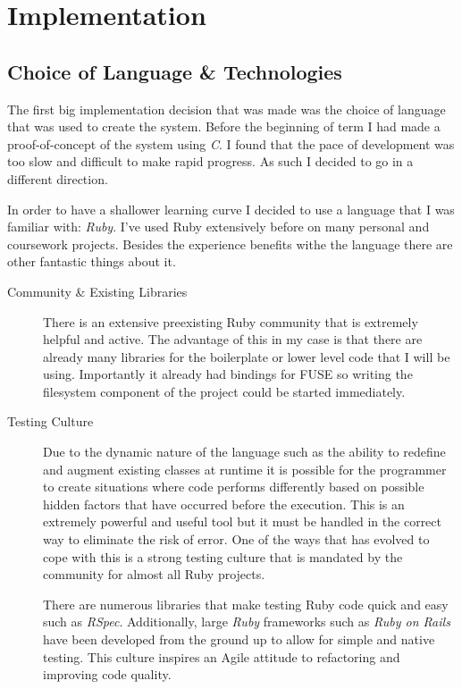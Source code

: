 \chapter{Implementation}

\section{Choice of Language \& Technologies}

The first big implementation decision that was made was the choice of language that was used to create the system. Before the beginning of term I had made a proof-of-concept of the system using \emph{C}. I found that the pace of development was too slow and difficult to make rapid progress. As such I decided to go in a different direction.

In order to have a shallower learning curve I decided to use a language that I was familiar with: \emph{Ruby}. I've used Ruby extensively before on many personal and coursework projects. Besides the experience benefits withe the language there are other fantastic things about it.

\begin{description}

\item[Community \& Existing Libraries] \hfill

There is an extensive preexisting Ruby community that is extremely helpful and active. The advantage of this in my case is that there are already many libraries for the boilerplate or lower level code that I will be using. Importantly it already had bindings for \ac{FUSE} so writing the filesystem component of the project could be started immediately.

\item[Testing Culture] \hfill

Due to the dynamic nature of the language such as the ability to redefine and augment existing classes at runtime it is possible for the programmer to create situations where code performs differently based on possible hidden factors that have occurred before the execution. This is an extremely powerful and useful tool but it must be handled in the correct way to eliminate the risk of error. One of the ways that has evolved to cope with this is a strong testing culture that is mandated by the community for almost all Ruby projects.

There are numerous libraries that make testing Ruby code quick and easy such as \emph{RSpec}. Additionally, large \emph{Ruby} frameworks such as \emph{Ruby on Rails} have been developed from the ground up to allow for simple and native testing. This culture inspires an Agile attitude to refactoring and improving code quality.

\end{description}

